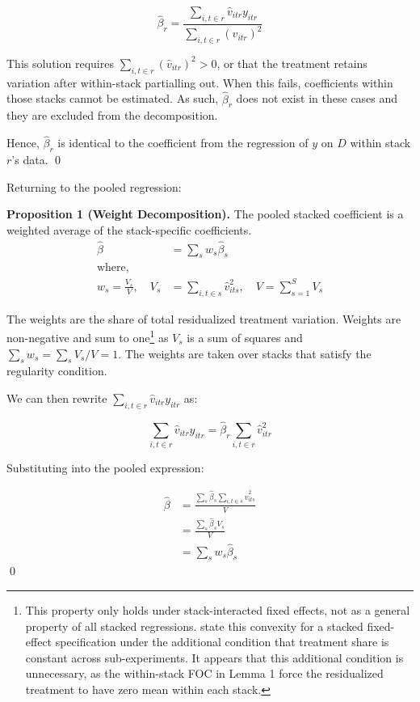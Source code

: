 \documentclass[12pt]{article}
\begin{document}
\begin{equation*}
    \hat{\beta}_r = \frac{\sum_{i,t\in r} \hat{v}_{itr} y_{itr}}{ \sum_{i,t\in r} (\hat{v}_{itr})^2}
\end{equation*}

This solution requires $\sum_{i,t\in r} (\hat{v}_{itr})^2 > 0$, or that the treatment retains variation after within-stack partialling out. When this fails, coefficients within those stacks cannot be estimated. As such, $\hat{\beta}_r$ does not exist in these cases and they are excluded from the decomposition. 

Hence, $\hat{\beta}_r$ is identical to the coefficient from the regression of $y$ on $D$ within stack $r$'s data. \qed

Returning to the pooled regression:

\textbf{Proposition 1 (Weight Decomposition).} The pooled stacked coefficient is a weighted average of the stack-specific coefficients. \begin{align*}
    \hat{\beta} &= \sum_s w_s \hat{\beta}_s \\
    \text{where,} \\
    w_s =\frac{V_s}{V}, \quad V_s &= \sum_{i,t \in s} \hat{v}^2_{its}, \quad V = \sum_{s=1}^S V_s
\end{align*}

The weights are the share of total residualized treatment variation. Weights are non-negative and sum to one\footnote{This property only holds under stack-interacted fixed effects, not as a general property of all stacked regressions. \textcite{wing2024stacked} state this convexity for a stacked fixed-effect specification under the additional condition that treatment share is constant across sub-experiments. It appears that this additional condition is unnecessary, as the within-stack FOC in Lemma 1 force the residualized treatment to have zero mean within each stack.} as $V_s$ is a sum of squares and $\sum_s w_s = \sum_s V_s / V = 1$. The weights are taken over stacks that satisfy the regularity condition.

We can then rewrite $\sum_{i,t \in r} \hat{v}_{itr} y_{itr}$ as:

\begin{equation*}
    \sum_{i,t \in r} \hat{v}_{itr} y_{itr} = \hat{\beta}_r \sum_{i,t \in r} \hat{v}_{itr}^2
\end{equation*}

Substituting into the pooled expression:

\begin{align*}
    \hat{\beta} &= \frac{\sum_s \hat{\beta}_s \sum_{i,t \in s} \hat{v}_{its}^2}{V} \\
    &= \frac{\sum_s \hat{\beta}_s V_s}{V} \\
    &= \sum_s w_s \hat{\beta}_s 
\end{align*} \qed
\end{document}
